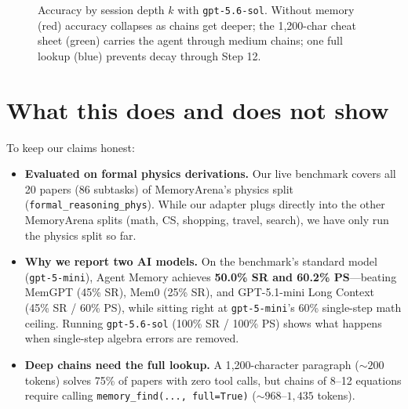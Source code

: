 \documentclass[11pt,a4paper]{article}
\begin{document}
\begin{figure}[H]
\centering
{}
\caption{Accuracy by session depth $k$ with \texttt{gpt-5.6-sol}. Without memory (red) accuracy collapses as chains get deeper; the 1{,}200-char cheat sheet (green) carries the agent through medium chains; one full lookup (blue) prevents decay through Step 12.}
\label{fig:depth}
\end{figure}

\section{What this does and does not show}

To keep our claims honest:
\begin{itemize}[itemsep=2pt,leftmargin=1.5em]
  \item \textbf{Evaluated on formal physics derivations.} Our live benchmark covers all 20 papers (86 subtasks) of MemoryArena's physics split (\texttt{formal\_reasoning\_phys}). While our adapter plugs directly into the other MemoryArena splits (math, CS, shopping, travel, search), we have only run the physics split so far.
  \item \textbf{Why we report two AI models.} On the benchmark's standard model (\texttt{gpt-5-mini}), Agent Memory achieves \textbf{50.0\% SR and 60.2\% PS}---beating MemGPT (45\% SR), Mem0 (25\% SR), and GPT-5.1-mini Long Context (45\% SR / 60\% PS), while sitting right at \texttt{gpt-5-mini}'s 60\% single-step math ceiling. Running \texttt{gpt-5.6-sol} (100\% SR / 100\% PS) shows what happens when single-step algebra errors are removed.
  \item \textbf{Deep chains need the full lookup.} A 1{,}200-character paragraph ($\sim 200$ tokens) solves 75\% of papers with zero tool calls, but chains of 8--12 equations require calling \texttt{memory\_find(..., full=True)} ($\sim 968$--$1{,}435$ tokens).
\end{itemize}
\end{document}
